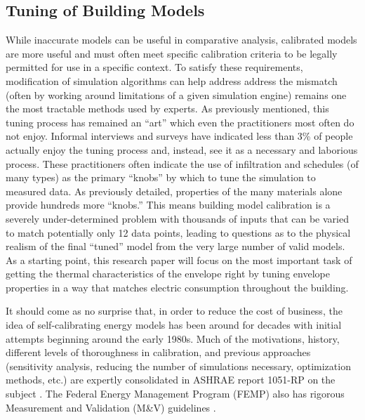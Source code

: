 \documentclass[preprint, review, 12pt]{elsarticle}
\begin{document}
\subsection{Tuning of Building Models}
While inaccurate models can be useful in comparative analysis, calibrated models are more useful and must often meet specific calibration criteria to be legally permitted for use in a specific context. To satisfy these requirements, modification of simulation algorithms can help address address the mismatch (often by working around limitations of a given simulation engine) remains one the most tractable methods used by experts. As previously mentioned, this tuning process has remained an ``art'' which even the practitioners most often do not enjoy. Informal interviews and surveys have indicated less than 3\% of people actually enjoy the tuning process and, instead, see it as a necessary and laborious process. These practitioners often indicate the use of infiltration and schedules (of many types) as the primary ``knobs'' by which to tune the simulation to measured data. As previously detailed, properties of the many materials alone provide hundreds more ``knobs.'' This means building model calibration is a severely under-determined problem with thousands of inputs that can be varied to match potentially only 12 data points, leading to questions as to the physical realism of the final ``tuned'' model from the very large number of valid models. As a starting point, this research paper will focus on the most important task of getting the thermal characteristics of the envelope right by tuning envelope properties in a way that matches electric consumption throughout the building.

It should come as no surprise that, in order to reduce the cost of business, the idea of self-calibrating energy models has been around for decades with initial attempts beginning around the early 1980s. Much of the motivations, history, different levels of thoroughness in calibration, and previous approaches (sensitivity analysis, reducing the number of simulations necessary, optimization methods, etc.) are expertly consolidated in ASHRAE report 1051-RP on the subject \cite{cit:reddy2006}. The Federal Energy Management Program (FEMP) also has rigorous Measurement and Validation (M\&V) guidelines \cite{cit:femp2008}.
\end{document}
